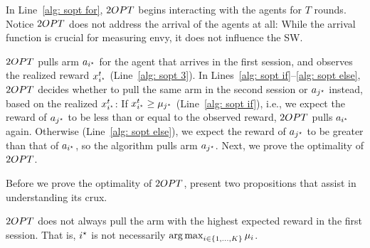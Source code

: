 In Line~\ref{alg: sopt for}, $2OPT$ begins interacting with the agents for $T$ rounds.
Notice $2OPT$ does not address the arrival of the agents at all: While the arrival function is crucial for measuring envy, it does not influence the SW.

$2OPT$ pulls arm $a_{{i^\star}}$ for the agent that arrives in the first session, 
and observes the realized reward $x^t_{{i^\star}}$ (Line~\ref{alg: sopt 3}). In Lines~\ref{alg: sopt if}--\ref{alg: sopt else}, $2OPT$ decides whether to pull the same arm in the second session or $a_{{j^\star}}$ instead, based on the realized $x^t_{{i^\star}}$:
If $x^t_{{i^\star}} \geq \mu_{{j^\star}}$ (Line~\ref{alg: sopt if}), i.e., we expect the reward of $a_{{j^\star}}$ to be less than or equal to the observed reward, $2OPT$ pulls $a_{{i^\star}}$ again.
Otherwise (Line~\ref{alg: sopt else}), we expect the reward of $a_{{j^\star}}$  to be greater than that of $a_{{i^\star}}$, so the algorithm pulls arm $a_{{j^\star}}$. Next, we prove the optimality of $2OPT$.

Before we prove the optimality of $2OPT$, present two propositions that assist in understanding its crux.
\begin{proposition}\label{prop:is}
$2OPT$ does not always pull the arm with the highest expected reward in the first session. That is, ${i^\star}$ is not necessarily $\operatorname*{arg\,max}_{i\in \{1, \ldots, K \}}{\mu_i}$.
\end{proposition}

